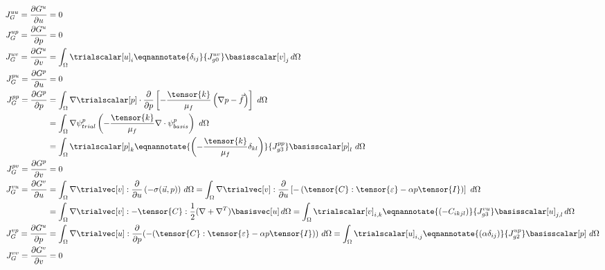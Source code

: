 \begin{align}
J_G^{uu} = \frac{\partial G^u}{\partial u} &= 0 \\
%
J_G^{up} = \frac{\partial G^u}{\partial p} &= 0 \\
J_G^{uv} = \frac{\partial G^u}{\partial v} &= \int_{\Omega} \trialscalar[u]_{i} \eqnannotate{\delta_{ij}}{J^{uv}_{g0}} \basisscalar[v]_{j} \, d\Omega \\
J_G^{pu} = \frac{\partial G^p}{\partial u} &= 0 \\
J_G^{pp} = \frac{\partial G^p}{\partial p} &= \int_{\Omega} \nabla
\trialscalar[p] \cdot \frac{\partial}{\partial p} \left[-\frac{\tensor{k}}{\mu_{f}} \left(\nabla p -
\vec{f} \right) \right] \ d\Omega \\
&= \int_{\Omega} \nabla \psi_{trial}^ p \left(-\frac{\tensor{k}}{\mu_{f}}
\nabla \cdot \psi_{basis}^p \right) \ d\Omega \\
&= \int_{\Omega} \trialscalar[p]_{k} \eqnannotate{\left(-\frac{\tensor{k}}{\mu_{f}}
\delta_{kl}\right)}{J_{g3}^{pp}}
\basisscalar[p]_{l} \ d\Omega \\
%
J_G^{pv} = \frac{\partial G^p}{\partial v} &= 0 \\
J_G^{vu} = \frac{\partial G^v}{\partial u} &= \int_{\Omega} \nabla \trialvec[v] : \frac{\partial}{\partial u} \left(- \sigma(\vec{u},p)\right) \, d\Omega
= \int_{\Omega} \nabla \trialvec[v] : \frac{\partial}{\partial u} \left[ -\left(\tensor{C} : \tensor{\varepsilon} -\alpha p \tensor{I} \right)\right] \ d\Omega \\
&= \int_{\Omega} \nabla \trialvec[v] : -\tensor{C}: \frac{1}{2} (\nabla + \nabla^T) \basisvec[u] \, d\Omega = \int_{\Omega} \trialscalar[v]_{i,k} \eqnannotate{ \left(-C_{ikjl} \right) }{J_{g3}^{vu} } \basisscalar[u]_{j,l} \, d \Omega \\
J_G^{vp} = \frac{\partial G^u}{\partial p} &= \int_{\Omega} \nabla \trialvec[u] : \frac{\partial}{\partial p}(-(\tensor{C}:\tensor{\varepsilon} -\alpha p \tensor{I})) \ d\Omega = \int_{\Omega} \trialscalar[u]_{i,j} \eqnannotate{\left(\alpha \delta_{ij}\right)}{J_{g2}^{up}} \basisscalar[p] \ d\Omega \\
%
J_G^{vv} = \frac{\partial G^v}{\partial v} &= 0
\end{align}
